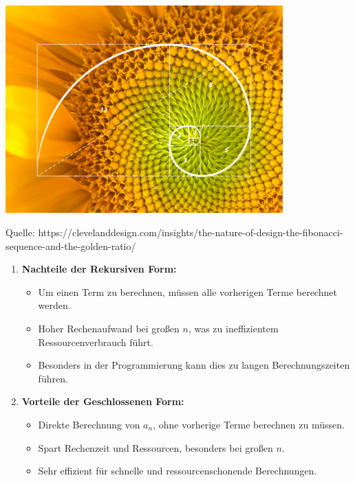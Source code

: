 \documentclass{beamer}
\begin{document}
\begin{frame}
    \begin{center}
           \includegraphics[width=0.8\textwidth]{sonnenblum.png}
    \end{center}
     \vspace{1em}
\hfill \tiny Quelle: { https://clevelanddesign.com/insights/the-nature-of-design-the-fibonacci-sequence-and-the-golden-ratio/ }
\end{frame}


\begin{frame}
    \begin{enumerate}
        \item \textbf{Nachteile der Rekursiven Form:}
        \begin{itemize}
            \item Um einen Term zu berechnen, müssen alle vorherigen Terme berechnet werden.
            \item Hoher Rechenaufwand bei großen \( n \), was zu ineffizientem Ressourcenverbrauch führt.
            \item Besonders in der Programmierung kann dies zu langen Berechnungszeiten führen.
        \end{itemize}
        
        \item \textbf{Vorteile der Geschlossenen Form:}
        \begin{itemize}
            \item Direkte Berechnung von \( a_n \), ohne vorherige Terme berechnen zu müssen.
            \item Spart Rechenzeit und Ressourcen, besonders bei großen \( n \).
            \item Sehr effizient für schnelle und ressourcenschonende Berechnungen.
        \end{itemize}
    \end{enumerate}
\end{frame}
\end{document}
